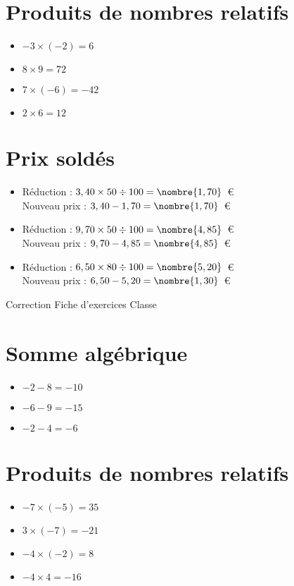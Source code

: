 \documentclass[a4paper,11pt,fleqn]{article}
\begin{document}
\section{Produits de nombres relatifs}
\begin{itemize}

  \item $-3\times(-2)=6$
  \item $8\times9=72$
  \item $7\times(-6)=-42$
  \item $2\times6=12$
\end{itemize}

\section{Prix soldés}
\begin{itemize}

  \item Réduction : $3,40\times50\div100=\nombre{1,70}$~€\\
  Nouveau prix : $3,40-1,70=\nombre{1,70}$~€
  \item Réduction : $9,70\times50\div100=\nombre{4,85}$~€\\
  Nouveau prix : $9,70-4,85=\nombre{4,85}$~€
  \item Réduction : $6,50\times80\div100=\nombre{5,20}$~€\\
  Nouveau prix : $6,50-5,20=\nombre{1,30}$~€
\end{itemize}
\newpage
\setcounter{exo}{0}
\setcounter{section}{0}
{Correction} \hfill {\huge Fiche d'exercices } \hfill {Classe}

\section{Somme algébrique}
\begin{itemize}

  \item $-2 -8=-10$
  \item $-6 -9=-15$
  \item $-2 -4=-6$
\end{itemize}

\section{Produits de nombres relatifs}
\begin{itemize}

  \item $-7\times(-5)=35$
  \item $3\times(-7)=-21$
  \item $-4\times(-2)=8$
  \item $-4\times4=-16$
\end{itemize}
\end{document}
